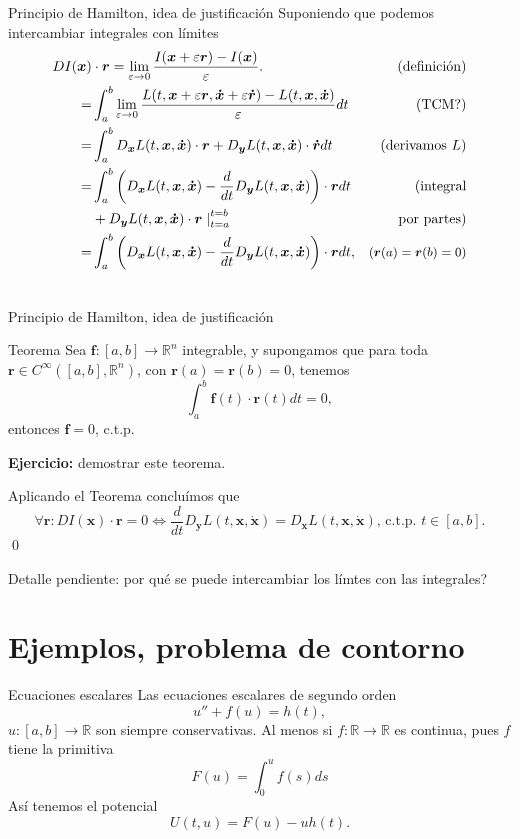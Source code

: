 \documentclass[handout,hyperref={colorlinks=true}]{beamer}
\newcommand{\rr}{\mathbb{R}}
\renewcommand{\b}[1]{\boldsymbol{#1}}
\renewcommand{\epsilon}{\varepsilon}
\begin{document}
\begin{frame}{Principio de Hamilton, idea de justificación  } 
Suponiendo que podemos intercambiar integrales con límites
\begin{align} DI(\b{x})&\cdot \b{r}=\lim_{\epsilon\to 0}\frac{I(\b{x}+\epsilon \b{r})-I(\b{x})}{\epsilon}. &\text{(definición)}\notag\\
=& \int_a^b\lim_{\epsilon\to 0}\frac{L(t,\b{x}+\epsilon \b{r},\b{\dot{x}}+\epsilon \b{\dot{r}}  )- L(t,\b{x},\b{\dot{x}} )  }{\epsilon}dt&\text{(TCM?)}\notag\\
=& \int_a^b D_{\b{x}}L(t,\b{x},\b{\dot{x}})\cdot \b{r}+  D_{\b{y}}L(t,\b{x},\b{\dot{x}})\cdot \b{\dot{r}}dt&\text{(derivamos $L$)}\notag\\
=& \int_a^b \left( D_{\b{x}}L(t,\b{x},\b{\dot{x}})-\frac{d}{dt} D_{\b{y}}L(t,\b{x},\b{\dot{x}})\right) \cdot \b{r}dt&\text{(integral}\notag\\
&+ D_{\b{y}}L(t,\b{x},\b{\dot{x}}) \cdot \b{r}\left.\right|_{t=a}^{t=b} &\text{por partes)}\notag\\
=& \int_a^b \left( D_{\b{x}}L(t,\b{x},\b{\dot{x}})-\frac{d}{dt} D_{\b{y}}L(t,\b{x},\b{\dot{x}})\right) \cdot \b{r}dt,& \small{(\b{r}(a)=\b{r}(b)=0)}\notag\\ \notag
\end{align}


\end{frame}
\begin{frame}{Principio de Hamilton, idea de justificación  } 
\begin{block}{Teorema} Sea $\b{f}:[a,b]\to\rr^n$ integrable, y supongamos que para toda $\b{r}\in C^{\infty}([a,b],\rr^n)$, con $\b{r}(a)=\b{r}(b)=0$, tenemos
\[\int_a^b\b{f}(t)\cdot \b{r}(t)dt=0,\]
entonces $\b{f}=0$, c.t.p.
\end{block}
\textbf{Ejercicio:} demostrar este teorema.

Aplicando el Teorema concluímos que 
\[ \forall \b{r}: DI(\b{x})\cdot \b{r}=0 \Leftrightarrow \frac{d}{dt} D_{\b{y}}L(t,\b{x},\b{\dot{x}})=D_{\b{x}}L(t,\b{x},\b{\dot{x}}),\, \text{c.t.p. } t\in[a,b] .\] \qed

Detalle pendiente: por qué se puede intercambiar los límtes con las integrales?
\end{frame}







\section{Ejemplos, problema de contorno}
\begin{frame}{Ecuaciones escalares}
   Las ecuaciones escalares de segundo orden
\[u''+f(u)=h(t),\]
$u:[a,b]\to\rr$ son siempre conservativas. Al menos si $f:\rr\to\rr$ es continua, pues $f$ tiene la primitiva
\[F(u)=\int_0^uf(s)ds\] 
Así tenemos el potencial
\[U(t,u)=F(u)-uh(t).\]
\end{frame}
\end{document}
